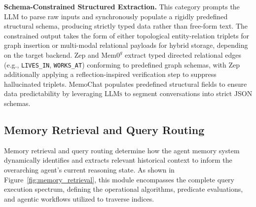 \documentclass{llmxive}
\providecommand{\llms}{\textsc{LLMs}\xspace}
\begin{document}
\noindent  \textbf{Schema-Constrained Structured Extraction.}
This category prompts the LLM to parse raw inputs and synchronously populate a rigidly predefined structural schema, producing strictly typed data rather than free-form text. The constrained output takes the form of either topological entity-relation triplets for graph insertion or multi-modal relational payloads for hybrid storage, depending on the target backend.
Zep and $\text{Mem0}^g$ extract typed directed relational edges (e.g., \texttt{LIVES\_IN}, \texttt{WORKS\_AT}) conforming to predefined graph schemas, with Zep additionally applying a reflection-inspired verification step to suppress hallucinated triplets.
MemoChat populates predefined structural fields to ensure data predictability by leveraging \llms to segment conversations into strict JSON schemas.



\subsection{Memory Retrieval and Query Routing}
\label{subsec:retrieval}

Memory retrieval and query routing determine how the agent memory system dynamically identifies and extracts relevant historical context to inform the overarching agent's current reasoning state.
As shown in Figure~\ref{fig:memory_retrieval}, this module encompasses the complete query execution spectrum, defining the operational algorithms, predicate evaluations, and agentic workflows utilized to traverse indices. 

\end{document}
